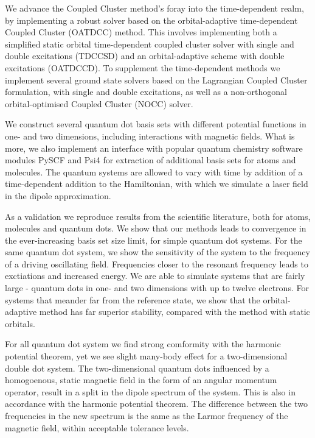 We advance the Coupled Cluster method's foray into the time-dependent realm, 
by implementing a robust solver based on the orbital-adaptive time-dependent 
Coupled Cluster (OATDCC)\cite{kvaal2012ab} method.
This involves implementing both a simplified static
orbital time-dependent coupled cluster solver with single and double excitations 
(TDCCSD) and an orbital-adaptive scheme with double excitations (OATDCCD).
To supplement the time-dependent methods we implement several ground state 
solvers based on the Lagrangian Coupled Cluster formulation, with single and double 
excitations, as well as a non-orthogonal orbital-optimised Coupled Cluster (NOCC)
solver\cite{myhre2018demonstrating}.

We construct several quantum dot basis sets with different potential functions
in one- and two dimensions, including interactions with magnetic fields.
What is more, we also implement an 
interface with popular quantum chemistry software modules PySCF\cite{PYSCF}
and Psi4\cite{parrish2017psi4} for extraction of additional 
basis sets for atoms and molecules. The quantum systems are allowed to vary with time 
by addition of a time-dependent addition to the Hamiltonian, with which we simulate 
a laser field in the dipole approximation.

As a validation we reproduce results from the scientific literature, both for 
atoms, molecules and quantum dots. We show that our methods leads to convergence in 
the ever-increasing basis set size limit, for simple quantum dot systems. For the 
same quantum dot system, we show the sensitivity of the system to the frequency of 
a driving oscillating field. Frequencies closer to the resonant frequency 
leads to exctiations and increased energy. We are able to simulate systems that 
are fairly large - quantum dots in one- and two dimensions with up to twelve 
electrons. For systems that meander far from the reference state, we show that 
the orbital-adaptive method has far superior stability, compared with the 
method with static orbitals.

For all quantum dot system we find 
strong comformity with the harmonic potential theorem\cite{kohn1961cyclotron},
yet we see slight many-body 
effect for a two-dimensional double dot system. The two-dimensional quantum dots 
influenced by a homogoenous, static magnetic field in the form of an angular 
momentum operator, result in a split in the dipole spectrum of the system. This
is also in accordance with the harmonic potential theorem.
The difference between the two frequencies in the new spectrum is the same as the
Larmor frequency of the magnetic field, within acceptable tolerance levels. 